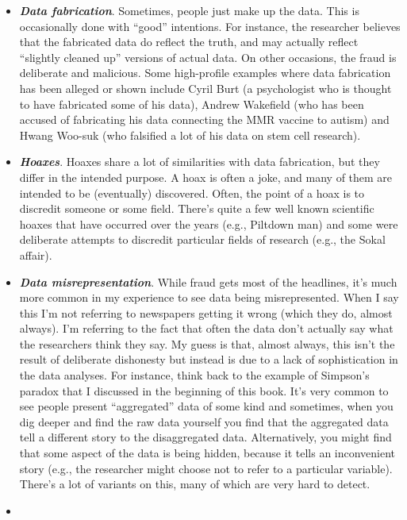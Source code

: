 \documentclass[
]{book}
\providecommand{\tightlist}{%
  \setlength{\itemsep}{0pt}\setlength{\parskip}{0pt}}
\begin{document}
\begin{itemize}
\tightlist
\item
  \textbf{\emph{Data fabrication}}. Sometimes, people just make up the data. This is occasionally done with ``good'' intentions. For instance, the researcher believes that the fabricated data do reflect the truth, and may actually reflect ``slightly cleaned up'' versions of actual data. On other occasions, the fraud is deliberate and malicious. Some high-profile examples where data fabrication has been alleged or shown include Cyril Burt (a psychologist who is thought to have fabricated some of his data), Andrew Wakefield (who has been accused of fabricating his data connecting the MMR vaccine to autism) and Hwang Woo-suk (who falsified a lot of his data on stem cell research).\\
\item
  \textbf{\emph{Hoaxes}}. Hoaxes share a lot of similarities with data fabrication, but they differ in the intended purpose. A hoax is often a joke, and many of them are intended to be (eventually) discovered. Often, the point of a hoax is to discredit someone or some field. There's quite a few well known scientific hoaxes that have occurred over the years (e.g., Piltdown man) and some were deliberate attempts to discredit particular fields of research (e.g., the Sokal affair).
\item
  \textbf{\emph{Data misrepresentation}}. While fraud gets most of the headlines, it's much more common in my experience to see data being misrepresented. When I say this I'm not referring to newspapers getting it wrong (which they do, almost always). I'm referring to the fact that often the data don't actually say what the researchers think they say. My guess is that, almost always, this isn't the result of deliberate dishonesty but instead is due to a lack of sophistication in the data analyses. For instance, think back to the example of Simpson's paradox that I discussed in the beginning of this book. It's very common to see people present ``aggregated'' data of some kind and sometimes, when you dig deeper and find the raw data yourself you find that the aggregated data tell a different story to the disaggregated data. Alternatively, you might find that some aspect of the data is being hidden, because it tells an inconvenient story (e.g., the researcher might choose not to refer to a particular variable). There's a lot of variants on this, many of which are very hard to detect.
\item

\end{itemize}
\end{document}
